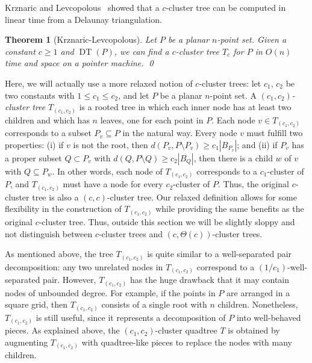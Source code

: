 \documentclass[11pt]{paper}
\DeclareMathOperator {\DT}{DT}
\newtheorem {theorem} {Theorem}[section]
\begin{document}
    
    Krznaric and Levcopolous~\cite[Theorem~7]{KrznaricLe95} showed that a
    $c$-cluster tree can be computed in linear time from a Delaunay 
    triangulation.
    \begin{theorem}[Krznaric-Levcopolous]\label{thm:c-cluster-tree}
      Let $P$ be a planar $n$-point set.
      Given a constant $c \geq 1$ and $\DT(P)$, we can find a $c$-cluster
      tree $T_c$ for $P$ in $O(n)$ time and space on a pointer machine.
      \qed
    \end{theorem}

    Here, we will actually use a more relaxed notion of $c$-cluster
    trees: let $c_1$, $c_2$ be two constants with
    $1 \leq c_1 \leq c_2$, and let $P$ be a planar $n$-point set.
    A \emph{$(c_1, c_2)$-cluster tree} $T_{(c_1, c_2)}$ is a rooted
    tree in which each inner node has at least two children and
    which has $n$ leaves, one for each point in $P$. 
    Each node $v \in T_{(c_1,c_2)}$ corresponds to a subset $P_v \subseteq P$
    in the natural way. Every node $v$ must fulfill
    two properties:
    (i) if $v$ is not the root, then
      $d(P_v, P \setminus P_v) \geq c_1|B_{P_v}|$; and
    (ii) if $P_v$ has a proper subset $Q \subset P_v$ with
       $d(Q, P \setminus Q) \geq c_2|B_Q|$, then
       there is a child $w$ of $v$ with $Q \subseteq P_w$.
    In other words, each node of $T_{(c_1, c_2)}$ corresponds to
    a $c_1$-cluster of $P$, and $T_{(c_1, c_2)}$ must have a node for every
    $c_2$-cluster of $P$.  Thus, the original $c$-cluster tree is also 
    a $(c,c)$-cluster tree. Our relaxed definition allows for some flexibility
    in the construction of $T_{(c_1, c_2)}$ while providing the same
    benefits as the original  $c$-cluster tree. Thus, outside this section
    we will be slightly sloppy and not distinguish between $c$-cluster trees
    and $(c, \Theta(c))$-cluster trees.

      As mentioned above, the tree $T_{(c_1, c_2)}$ is quite similar 
      to a well-separated pair decomposition: any two unrelated nodes
      in $T_{(c_1,c_2)}$ correspond to a $(1/c_1)$-well-separated pair. 
      However, $T_{(c_1, c_2)}$ has the huge drawback that it may contain
      nodes of unbounded degree.  For example, if
      the points in $P$ are arranged in a square grid,
      then $T_{(c_1,c_2)}$ consists of a single root with $n$ children.
      Nonetheless, $T_{(c_1,c_2)}$ is still useful, since it represents
      a decomposition of $P$ into well-behaved pieces. 
      As explained above,  the $(c_1, c_2)$-cluster quadtree
      $T$ is obtained by augmenting $T_{(c_1, c_2)}$
      with quadtree-like pieces to replace the nodes with many children.
\end{document}
